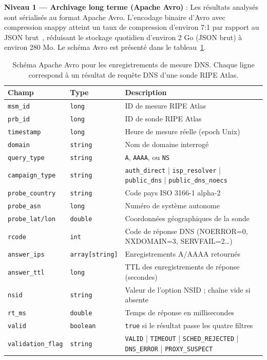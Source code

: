 \textbf{Niveau 1 --- Archivage long terme (Apache Avro)} : Les résultats analysés sont sérialisés au format Apache Avro. L'encodage binaire d'Avro avec compression snappy atteint un taux de compression d'environ 7:1 par rapport au JSON brut~\cite{vanRijswijk2016}, réduisant le stockage quotidien d'environ 2 Go (JSON brut) à environ 280 Mo. Le schéma Avro est présenté dans le tableau~\ref{tab:avro_schema}.

\begin{table}[H]
\centering
\small
\begin{tabularx}{\linewidth}{p{3.2cm} p{2.4cm} X}
\toprule
\textbf{Champ} & \textbf{Type} & \textbf{Description} \\
\midrule
\texttt{msm\_id}          & \texttt{long}          & ID de mesure RIPE Atlas \\
\texttt{prb\_id}          & \texttt{long}          & ID de sonde RIPE Atlas \\
\texttt{timestamp}        & \texttt{long}          & Heure de mesure réelle (epoch Unix) \\
\texttt{domain}           & \texttt{string}        & Nom de domaine interrogé \\
\texttt{query\_type}      & \texttt{string}        & \texttt{A}, \texttt{AAAA}, ou \texttt{NS} \\
\texttt{campaign\_type}   & \texttt{string}        & \texttt{auth\_direct} | \texttt{isp\_resolver} | \texttt{public\_dns} | \texttt{public\_dns\_noecs} \\
\texttt{probe\_country}   & \texttt{string}        & Code pays ISO 3166-1 alpha-2 \\
\texttt{probe\_asn}       & \texttt{long}          & Numéro de système autonome \\
\texttt{probe\_lat/lon}   & \texttt{double}        & Coordonnées géographiques de la sonde \\
\texttt{rcode}            & \texttt{int}           & Code de réponse DNS (NOERROR=0, NXDOMAIN=3, SERVFAIL=2\ldots) \\
\texttt{answer\_ips}      & \texttt{array[string]} & Enregistrements A/AAAA retournés \\
\texttt{answer\_ttl}      & \texttt{long}          & TTL des enregistrements de réponse (secondes) \\
\texttt{nsid}             & \texttt{string}        & Valeur de l'option NSID ; chaîne vide si absente \\
\texttt{rt\_ms}           & \texttt{double}        & Temps de réponse en millisecondes \\
\texttt{valid}            & \texttt{boolean}       & \texttt{true} si le résultat passe les quatre filtres \\
\texttt{validation\_flag} & \texttt{string}        & \texttt{VALID} | \texttt{TIMEOUT} | \texttt{SCHED\_REJECTED} | \texttt{DNS\_ERROR} | \texttt{PROXY\_SUSPECT} \\
\bottomrule
\end{tabularx}
\caption{Schéma Apache Avro pour les enregistrements de mesure DNS. Chaque ligne correspond à un résultat de requête DNS d'une sonde RIPE Atlas.}
\label{tab:avro_schema}
\end{table}

